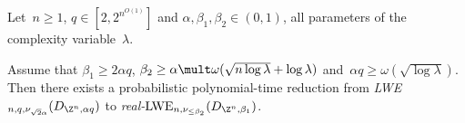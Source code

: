 \begin{theorem}\label{th:real}
  Let~$n \geq 1$, $q \in [2, 2^{n^{O(1)}}]$ and $\alpha, \beta_1, \beta_2
  \in (0,1)$, all parameters of the complexity variable~$\lambda$.
  
  Assume that $\beta_1 \geq 2 \alpha q $, 
  $\beta_2 \geq \alpha \mult \omega(\sqrt{n \log \lambda} + \log \lambda)$ and~$\alpha q \geq \omega(\sqrt{\log \lambda})$.  
  Then there exists a probabilistic polynomial-time
  reduction from \emph{LWE$_{n,q,\nu_{\sqrt{2}\alpha}}(D_{\Z^n, \alpha q})$}
  to \emph{real-$\text{LWE}_{n,\nu_{\leq \beta_2}}(D_{\Z^n, \beta_1})$}.
\end{theorem}

